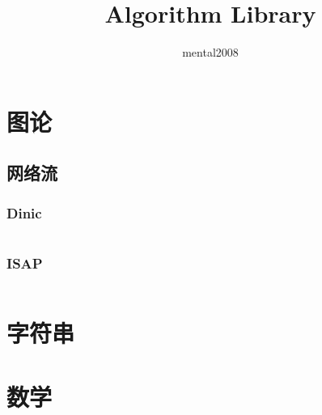\documentclass[a4paper,fleqn,11pt]{article}
\author{mental2008}
\title{Algorithm Library}
\begin{document}
 
\maketitle %

\newpage %
\tableofcontents %

\newpage
\section{图论} %

\subsection{网络流}

\subsubsection{Dinic}
\inputminted[breaklines]{c++}{graph/Dinic.cpp}

\subsubsection{ISAP}
\inputminted[breaklines]{c++}{graph/ISAP.cpp}


\newpage
\section{字符串}

\newpage
\section{数学}
\end{document}
